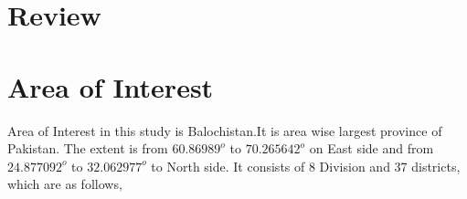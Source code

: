 \section*{Review}
\section*{Area of Interest}
Area of Interest in this study is Balochistan.It is area wise largest province of Pakistan.
The extent is from $60.86989^o$ to $70.265642^o$ on East side and from $24.877092^o$ to $32.062977^o$ to North side.
It consists of 8 Division and 37 districts, which are as follows,
\begin{tabular}
    \hline
    \Divisio
\end{tabular}




